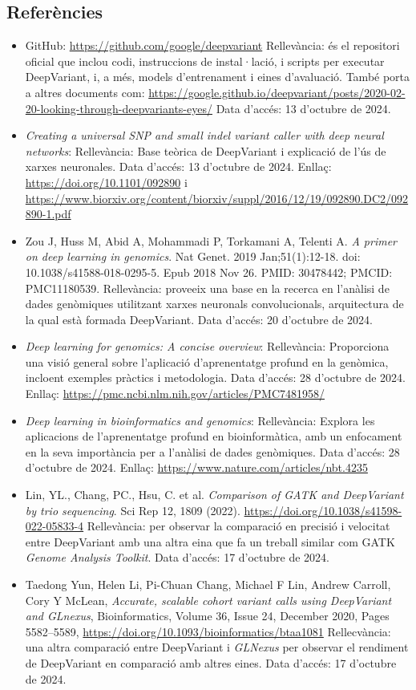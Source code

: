 \documentclass[a4paper]{article}
\begin{document}
	
	
	\subsection{Referències}
	
	\begin{itemize}
		\item GitHub: \url{https://github.com/google/deepvariant} Rellevància: és el repositori oficial que inclou codi, instruccions de instal·lació, i scripts per executar DeepVariant, i, a més, models d'entrenament i eines d'avaluació. També porta a altres documents com: \url{https://google.github.io/deepvariant/posts/2020-02-20-looking-through-deepvariants-eyes/} Data d'accés: 13 d'octubre de 2024.
		\item \emph{Creating a universal SNP and small indel variant caller with deep neural networks}:
		Rellevància: Base teòrica de DeepVariant i explicació de l'ús de xarxes neuronales.
		Data d'accés: 13 d'octubre de 2024.
		Enllaç: \url{https://doi.org/10.1101/092890}
		i \url{https://www.biorxiv.org/content/biorxiv/suppl/2016/12/19/092890.DC2/092890-1.pdf}
		\item Zou J, Huss M, Abid A, Mohammadi P, Torkamani A, Telenti A. \emph{A primer on deep learning in genomics}. Nat Genet. 2019 Jan;51(1):12-18. doi: 10.1038/s41588-018-0295-5. Epub 2018 Nov 26. PMID: 30478442; PMCID: PMC11180539. Rellevància: proveeix una base en la recerca en l'anàlisi de dades genòmiques utilitzant xarxes neuronals convolucionals, arquitectura de la qual està formada DeepVariant. Data d'accés: 20 d'octubre de 2024.
		\item \emph{Deep learning for genomics: A concise overview}:
		Rellevància: Proporciona una visió general sobre l'aplicació d'aprenentatge profund en la genòmica, incloent exemples pràctics i metodologia.
		Data d'accés: 28 d'octubre de 2024.
		Enllaç: \url{https://pmc.ncbi.nlm.nih.gov/articles/PMC7481958/}
		\item \emph{Deep learning in bioinformatics and genomics}:
		Rellevància: Explora les aplicacions de l'aprenentatge profund en bioinformàtica, amb un enfocament en la seva importància per a l'anàlisi de dades genòmiques.
		Data d'accés: 28 d'octubre de 2024.
		Enllaç: \url{https://www.nature.com/articles/nbt.4235}
		\item Lin, YL., Chang, PC., Hsu, C. et al. \textit{Comparison of GATK and DeepVariant by trio sequencing}. Sci Rep 12, 1809 (2022). \url{https://doi.org/10.1038/s41598-022-05833-4} Rellevància: per observar la comparació en precisió i velocitat entre DeepVariant amb una altra eina que fa un treball similar com GATK \textit{Genome Analysis Toolkit}. Data d'accés: 17 d'octubre de 2024.
		\item Taedong Yun, Helen Li, Pi-Chuan Chang, Michael F Lin, Andrew Carroll, Cory Y McLean, \textit{Accurate, scalable cohort variant calls using DeepVariant and GLnexus}, Bioinformatics, Volume 36, Issue 24, December 2020, Pages 5582–5589, \url{https://doi.org/10.1093/bioinformatics/btaa1081} Rellecvància: una altra comparació entre DeepVariant i \textit{GLNexus} per observar el rendiment de DeepVariant en comparació amb altres eines. Data d'accés: 17 d'octubre de 2024.
	\end{itemize}
\end{document}
